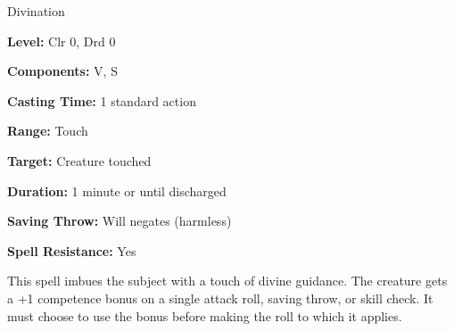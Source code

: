 
Divination

\textbf{Level:} Clr 0, Drd 0

\textbf{Components:} V, S

\textbf{Casting Time:} 1 standard action

\textbf{Range:} Touch

\textbf{Target:} Creature touched

\textbf{Duration:} 1 minute or until discharged

\textbf{Saving Throw:} Will negates (harmless)

\textbf{Spell Resistance:} Yes

This spell imbues the subject with a touch of divine guidance. The creature gets 
a +1 competence bonus on a single attack roll, saving throw, or skill check. It 
must choose to use the bonus before making the roll to which it applies.


